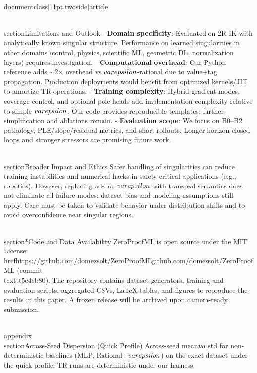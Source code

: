 \\documentclass[11pt,twoside]{article}
\begin{document}
\\section{Limitations and Outlook}
- \textbf{Domain specificity}: Evaluated on 2R IK with analytically known singular structure. Performance on learned singularities in other domains (control, physics, scientific ML, geometric DL, normalization layers) requires investigation.
- \textbf{Computational overhead}: Our Python reference adds $\sim$2$\times$ overhead vs $\\varepsilon$-rational due to value+tag propagation. Production deployments would benefit from optimized kernels/JIT to amortize TR operations.
- \textbf{Training complexity}: Hybrid gradient modes, coverage control, and optional pole heads add implementation complexity relative to simple $\\varepsilon$. Our code provides reproducible templates; further simplification and ablations remain.
- \textbf{Evaluation scope}: We focus on B0--B2 pathology, PLE/slope/residual metrics, and short rollouts. Longer-horizon closed loops and stronger stressors are promising future work.

\\section{Broader Impact and Ethics}
Safer handling of singularities can reduce training instabilities and numerical hacks in safety-critical applications (e.g., robotics). However, replacing ad-hoc $\\varepsilon$ with transreal semantics does not eliminate all failure modes: dataset bias and modeling assumptions still apply. Care must be taken to validate behavior under distribution shifts and to avoid overconfidence near singular regions.

\\section*{Code and Data Availability}
ZeroProofML is open source under the MIT License: \\href{https://github.com/domezsolt/ZeroProofML}{github.com/domezsolt/ZeroProofML} (commit \\texttt{5c4cb80}). The repository contains dataset generators, training and evaluation scripts, aggregated CSVs, LaTeX tables, and figures to reproduce the results in this paper. A frozen release will be archived upon camera-ready submission.

\\appendix
\\section{Across-Seed Dispersion (Quick Profile)}
Across-seed mean$\\pm$std for non-deterministic baselines (MLP, Rational+$\\varepsilon$) on the exact dataset under the quick profile; TR runs are deterministic under our harness.
\end{document}
